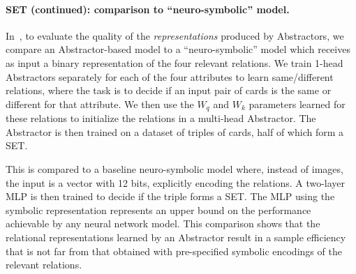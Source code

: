 \paragraph{SET (continued): comparison to ``neuro-symbolic'' model.}
In~, to evaluate the quality of the \textit{representations} produced by Abstractors, we compare an Abstractor-based model to a ``neuro-symbolic'' model which receives as input a binary representation of the four relevant relations. We train 1-head Abstractors separately for each of the four attributes to learn same/different relations, where the task is to decide if an input pair of cards is the same or different for that attribute. We then use the $W_q$ and $W_k$ parameters learned for these relations to initialize the relations in a multi-head Abstractor. The Abstractor is then trained on a dataset of triples of cards, half of which form a SET.

This is compared to a baseline neuro-symbolic model where, instead of images, the input is a vector with 12 bits,
explicitly encoding the relations.
A two-layer MLP is then trained to decide if the triple forms a SET. The MLP using the symbolic representation represents an upper bound on the performance achievable by any neural network model. This comparison shows that the relational representations learned by an Abstractor result in a sample efficiency that is not far from that obtained with pre-specified symbolic encodings of the relevant relations.



